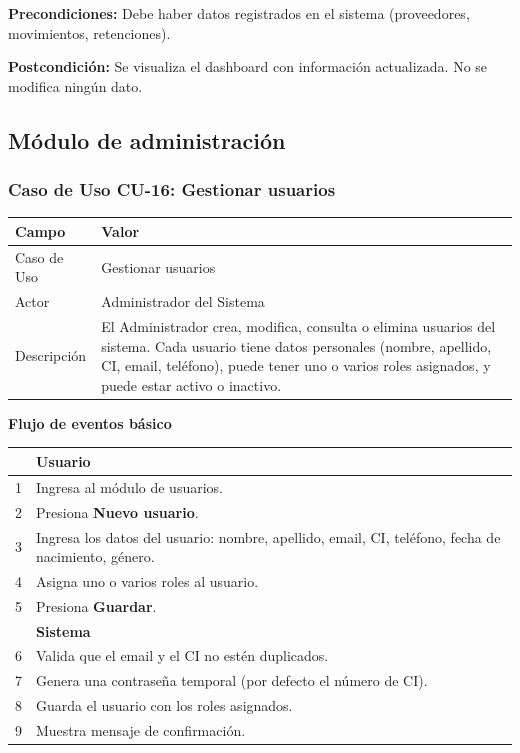 \documentclass[stu]{apa7}
\begin{document}
\vspace{0.3cm}

\textbf{Precondiciones:} Debe haber datos registrados en el sistema (proveedores, movimientos, retenciones).

\textbf{Postcondición:} Se visualiza el dashboard con información actualizada. No se modifica ningún dato.

\newpage

\subsection{Módulo de administración}

\subsubsection{Caso de Uso CU-16: Gestionar usuarios}

\begin{tabularx}{\textwidth}{|l|X|}
\hline
\rowcolor[gray]{0.9}
\textbf{Campo} & \textbf{Valor} \\
\hline
Caso de Uso & Gestionar usuarios \\
\hline
Actor & Administrador del Sistema \\
\hline
Descripción & El Administrador crea, modifica, consulta o elimina usuarios del sistema. Cada usuario tiene datos personales (nombre, apellido, CI, email, teléfono), puede tener uno o varios roles asignados, y puede estar activo o inactivo. \\
\hline
\end{tabularx}

\vspace{0.3cm}

\textbf{Flujo de eventos básico}

\begin{tabularx}{\textwidth}{|c|X|}
\hline
& \textbf{Usuario} \\
\hline
1 & Ingresa al módulo de usuarios. \\
\hline
2 & Presiona \textbf{Nuevo usuario}. \\
\hline
3 & Ingresa los datos del usuario: nombre, apellido, email, CI, teléfono, fecha de nacimiento, género. \\
\hline
4 & Asigna uno o varios roles al usuario. \\
\hline
5 & Presiona \textbf{Guardar}. \\
\hline
& \textbf{Sistema} \\
\hline
6 & Valida que el email y el CI no estén duplicados. \\
\hline
7 & Genera una contraseña temporal (por defecto el número de CI). \\
\hline
8 & Guarda el usuario con los roles asignados. \\
\hline
9 & Muestra mensaje de confirmación. \\
\hline
\end{tabularx}
\end{document}
